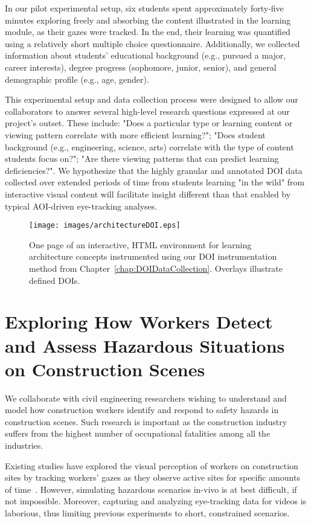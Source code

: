 In our pilot experimental setup, six students spent approximately forty-five minutes exploring freely and absorbing the content illustrated in the learning module, as their gazes were tracked. In the end, their learning was quantified using a relatively short multiple choice questionnaire. Additionally, we collected information about students' educational background (e.g., pursued a major, career interests), degree progress (sophomore, junior, senior), and general demographic profile (e.g., age, gender).

This experimental setup and data collection process were designed to allow our collaborators to answer several high-level research questions expressed at our project's outset. These include: "Does a particular type or learning content or viewing pattern correlate with more efficient learning?"; "Does student background (e.g., engineering, science, arts) correlate with the type of content students focus on?"; "Are there viewing patterns that can predict learning deficiencies?". We hypothesize that the highly granular and annotated DOI data collected over extended periods of time from students learning "in the wild" from interactive visual content will facilitate insight different than that enabled by typical AOI-driven eye-tracking analyses.

\begin{figure}[htbp]
  \centering
  \texttt{[image: images/architectureDOI.eps]}
  \caption{One page of an interactive, HTML environment for learning architecture concepts instrumented using our DOI instrumentation method from Chapter~\ref{chap:DOIDataCollection}. Overlays illustrate defined DOIs.}
	\label{fig:archictecture}
\end{figure}

\section{Exploring How Workers Detect and Assess Hazardous Situations on Construction Scenes}
\label{sec:ExperimentConstruction}
We collaborate with civil engineering researchers wishing to understand and model how construction workers identify and respond to safety hazards in construction scenes. Such research is important as the construction industry  suffers from the highest  number of  occupational fatalities  among all  the industries. 

Existing studies have explored the visual perception of workers on construction sites by tracking workers' gazes as they observe active sites for specific amounts of time~\cite{SafetyPerf}. However, simulating hazardous scenarios in-vivo is at best difficult, if not impossible. 
Moreover, capturing and analyzing eye-tracking data for videos is laborious, thus limiting previous experiments to short, constrained scenarios. 

